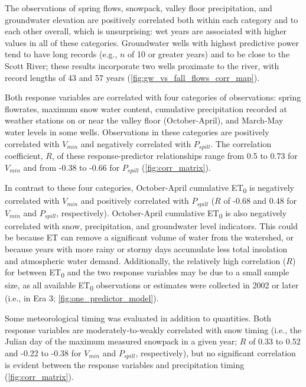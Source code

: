 \documentclass[hess, manuscript]{copernicus}
\begin{document}
The observations of spring flows, snowpack, valley floor precipitation,
and groundwater elevation are positively correlated both within each
category and to each other overall, which is unsurprising: wet years are
associated with higher values in all of these categories. Groundwater
wells with highest predictive power tend to have long records (e.g.,
\(n\) of 10 or greater years) and to be close to the Scott River; these
results incorporate two wells proximate to the river, with record
lengths of 43 and 57 years (\autoref{fig:gw_vs_fall_flows_corr_map}).

Both response variables are correlated with four categories of
observations: spring flowrates, maximum snow water content, cumulative
precipitation recorded at weather stations on or near the valley floor
(October-April), and March-May water levels in some wells. Observations
in these categories are positively correlated with \(V_{min}\) and
negatively correlated with \(P_{spill}\). The correlation coefficient,
\(R\), of these response-predictor relationships range from 0.5 to 0.73
for \(V_{min}\) and from -0.38 to -0.66 for \(P_{spill}\)
(\autoref{fig:corr_matrix}).

In contrast to these four categories, October-April cumulative
ET\textsubscript{0} is negatively correlated with \(V_{min}\) and
positively correlated with \(P_{spill}\) (\(R\) of -0.68 and 0.48 for
\(V_{min}\) and \(P_{spill}\), respectively). October-April cumulative
ET\textsubscript{0} is also negatively correlated with snow,
precipitation, and groundwater level indicators. This could be because
ET can remove a significant volume of water from the watershed, or
because years with more rainy or stormy days accumulate less total
insolation and atmospheric water demand. Additionally, the relatively
high correlation (\(R\)) for between ET\textsubscript{0} and the two
response variables may be due to a small sample size, as all available
ET\textsubscript{0} observations or estimates were collected in 2002 or
later (i.e., in Era 3; \autoref{fig:one_predictor_model}).

Some meteorological timing was evaluated in addition to quantities. Both
response variables are moderately-to-weakly correlated with snow timing
(i.e., the Julian day of the maximum measured snowpack in a given year;
\(R\) of 0.33 to 0.52 and -0.22 to -0.38 for \(V_{min}\) and
\(P_{spill}\), respectively), but no significant correlation is evident
between the response variables and precipitation timing
(\autoref{fig:corr_matrix}).
\end{document}
